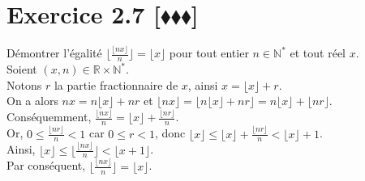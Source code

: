 \documentclass[10pt]{article}
\begin{document}

\section*{Exercice 2.7 [$\blacklozenge\blacklozenge\blacklozenge$]}
\begin{tcolorbox}[enhanced, width=6in, center, size=fbox, fontupper=\large, drop shadow southwest]
    Démontrer l'égalité $\lfloor\frac{\lfloor{nx}\rfloor}{n}\rfloor=\lfloor{x}\rfloor$ pour tout entier $n\in\mathbb{N}^*$ et tout réel $x$.\\[0.2cm]
    Soient $(x,n)\in\mathbb{R}\times\mathbb{N}^*$.\\[0.2cm]
    Notons $r$ la partie fractionnaire de $x$, ainsi $x=\lfloor{x}\rfloor+r$.\\[0.2cm]
    On a alors $nx=n\lfloor{x}\rfloor+nr$ et $\lfloor{nx}\rfloor=\lfloor{n\lfloor{x}\rfloor+nr}\rfloor=n\lfloor{x}\rfloor+\lfloor{nr}\rfloor$.\\[0.2cm]
    Conséquemment, $\frac{\lfloor{nx}\rfloor}{n}=\lfloor{x}\rfloor+\frac{\lfloor{nr}\rfloor}{n}$.\\[0.2cm]
    Or, $0\leq\frac{\lfloor{nr}\rfloor}{n}<1$ car $0\leq r<1$, donc $\lfloor{x}\rfloor\leq\lfloor{x}\rfloor+\frac{\lfloor{nr}\rfloor}{n}<\lfloor{x}\rfloor+1$.\\[0.2cm]
    Ainsi, $\lfloor{x}\rfloor\leq\lfloor\frac{\lfloor{nx}\rfloor}{n}\rfloor<\lfloor{x}+1\rfloor$.\\[0.2cm]
    Par conséquent, $\lfloor\frac{\lfloor{nx}\rfloor}{n}\rfloor = \lfloor{x}\rfloor$.
\end{tcolorbox}
\end{document}
